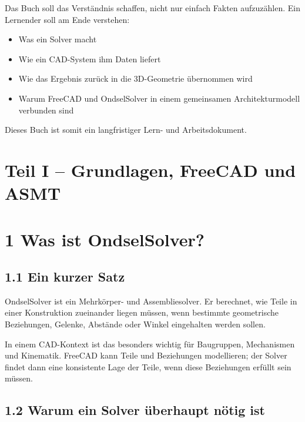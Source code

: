 \documentclass[
  12pt
]{book}
\providecommand{\tightlist}{%
  \setlength{\itemsep}{0pt}\setlength{\parskip}{0pt}}
\begin{document}
Das Buch soll das Verständnis schaffen, nicht nur einfach Fakten
aufzuzählen. Ein Lernender soll am Ende verstehen:

\begin{itemize}
\tightlist
\item
  Was ein Solver macht
\item
  Wie ein CAD-System ihm Daten liefert
\item
  Wie das Ergebnis zurück in die 3D-Geometrie übernommen wird
\item
  Warum FreeCAD und OndselSolver in einem gemeinsamen Architekturmodell
  verbunden sind
\end{itemize}

Dieses Buch ist somit ein langfristiger Lern- und Arbeitsdokument.

\hypertarget{grundlagen-freecad-und-asmt}{%
\chapter{\texorpdfstring{{Teil I --} Grundlagen, FreeCAD und
ASMT}{Teil I -- Grundlagen, FreeCAD und ASMT}}\label{grundlagen-freecad-und-asmt}}

\hypertarget{kap-was-ist-ondselsolver}{%
\chapter{\texorpdfstring{{1} Was ist
OndselSolver?}{1 Was ist OndselSolver?}}\label{kap-was-ist-ondselsolver}}

\hypertarget{ein-kurzer-satz}{%
\section{\texorpdfstring{{1.1} Ein kurzer
Satz}{1.1 Ein kurzer Satz}}\label{ein-kurzer-satz}}

OndselSolver ist ein Mehrkörper- und Assembliesolver. Er berechnet, wie
Teile in einer Konstruktion zueinander liegen müssen, wenn bestimmte
geometrische Beziehungen, Gelenke, Abstände oder Winkel eingehalten
werden sollen.

In einem CAD-Kontext ist das besonders wichtig für Baugruppen,
Mechanismen und Kinematik. FreeCAD kann Teile und Beziehungen
modellieren; der Solver findet dann eine konsistente Lage der Teile,
wenn diese Beziehungen erfüllt sein müssen.

\hypertarget{warum-ein-solver-uxfcberhaupt-nuxf6tig-ist}{%
\section{\texorpdfstring{{1.2} Warum ein Solver überhaupt nötig
ist}{1.2 Warum ein Solver überhaupt nötig ist}}\label{warum-ein-solver-uxfcberhaupt-nuxf6tig-ist}}
\end{document}

